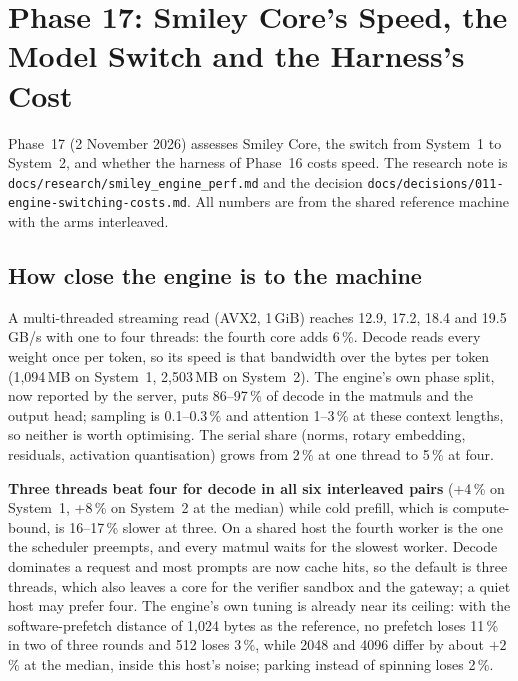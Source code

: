 \section{Phase 17: Smiley Core's Speed, the Model Switch and the Harness's Cost}
\label{sec:phase17}

Phase~17 (2 November 2026) assesses Smiley Core, the switch from System~1 to System~2, and whether the harness of Phase~16 costs speed. The
research note is \texttt{docs/research/smiley\_engine\_perf.md} and the decision \texttt{docs/decisions/011-engine-switching-costs.md}. All numbers are
from the shared reference machine with the arms interleaved.

\subsection{How close the engine is to the machine}

A multi-threaded streaming read (AVX2, 1\,GiB) reaches 12.9, 17.2, 18.4 and 19.5\,GB/s with one to four threads: the fourth core adds 6\,\%.
Decode reads every weight once per token, so its speed is that bandwidth over the bytes per token (1,094\,MB on System~1, 2,503\,MB on System~2).
The engine's own phase split, now reported by the server, puts 86--97\,\% of decode in the matmuls and the output head; sampling is
0.1--0.3\,\% and attention 1--3\,\% at these context lengths, so neither is worth optimising. The serial share (norms, rotary embedding,
residuals, activation quantisation) grows from 2\,\% at one thread to 5\,\% at four.

\textbf{Three threads beat four for decode in all six interleaved pairs} (+4\,\% on System~1, +8\,\% on System~2 at the median) while cold prefill, which is
compute-bound, is 16--17\,\% slower at three. On a shared host the fourth worker is the one the scheduler preempts, and every matmul waits for the
slowest worker. Decode dominates a request and most prompts are now cache hits, so the default is three threads, which also leaves a core for the verifier
sandbox and the gateway; a quiet host may prefer four. The engine's own tuning is already near its ceiling: with the software-prefetch distance of 1,024 bytes
as the reference, no prefetch loses 11\,\% in two of three rounds and 512 loses 3\,\%, while 2048 and 4096 differ by about $+2$\,\% at the median, inside this
host's noise; parking instead of spinning loses 2\,\%.

